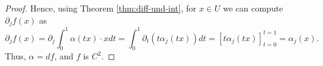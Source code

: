 \begin{proof}
    Hence, using Theorem \ref{thm:diff-und-int}, for $x \in U$ we can compute $\partial_j f(x)$ as
	$$
		\partial_j f(x)=\partial_j \int_0^1 \alpha(t x) \cdot x d t=\int_0^1 \partial_t\left(t \alpha _j(t x)\right) d t=\left[t \alpha _j(t x)\right]_{t=0}^{t=1}=\alpha _j(x) .
	$$
	Thus, $\alpha =d f$, and $f$ is $C^2$.
\end{proof}

